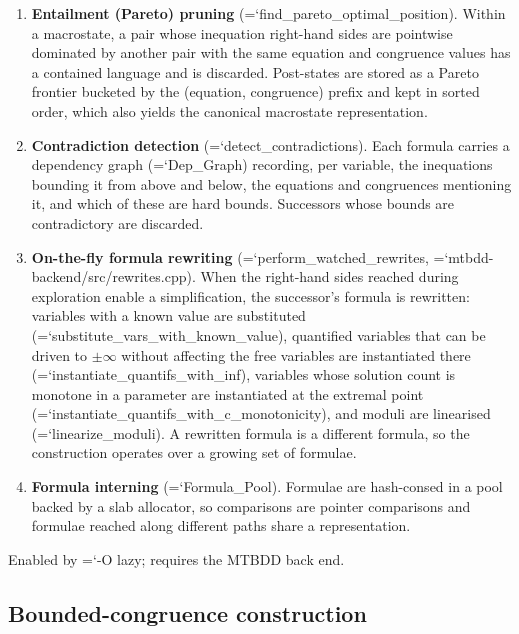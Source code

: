 \documentclass[10pt,a4paper]{article}
\newcommand{\code}[1]{{\small\ttfamily\hyphenchar\font=`\-\relax #1}}
\begin{document}
\begin{enumerate}
  \item \textbf{Entailment (Pareto) pruning} (\code{find\_pareto\_optimal\_position}).  Within a
        macrostate, a pair whose inequation right-hand sides are pointwise dominated by another pair
        with the same equation and congruence values has a contained language and is discarded.
        Post-states are stored as a Pareto frontier bucketed by the (equation, congruence) prefix and
        kept in sorted order, which also yields the canonical macrostate representation.
  \item \textbf{Contradiction detection} (\code{detect\_contradictions}).  Each formula carries a
        dependency graph (\code{Dep\_Graph}) recording, per variable, the inequations bounding it from
        above and below, the equations and congruences mentioning it, and which of these are hard
        bounds.  Successors whose bounds are contradictory are discarded.
  \item \textbf{On-the-fly formula rewriting} (\code{perform\_watched\_rewrites},
        \code{mtbdd-backend/src/rewrites.cpp}).  When the right-hand sides reached during exploration
        enable a simplification, the successor's formula is rewritten: variables with a known value are
        substituted (\code{substitute\_\allowbreak vars\_\allowbreak with\_\allowbreak known\_\allowbreak value}), quantified variables that can be
        driven to $\pm\infty$ without affecting the free variables are instantiated there
        (\code{instantiate\_quantifs\_with\_inf}), variables whose solution count is monotone in a
        parameter are instantiated at the extremal point
        (\code{instantiate\_\allowbreak quantifs\_\allowbreak with\_\allowbreak c\_\allowbreak monotonicity}), and moduli are linearised
        (\code{linearize\_moduli}).  A rewritten formula is a different formula, so the construction
        operates over a growing set of formulae.
  \item \textbf{Formula interning} (\code{Formula\_Pool}).  Formulae are hash-consed in a pool backed by
        a slab allocator, so comparisons are pointer comparisons and formulae reached along different
        paths share a representation.
\end{enumerate}

Enabled by \code{-O lazy}; requires the MTBDD back end.

\subsection{Bounded-congruence construction}
\label{sec:bounded-congruence}
\end{document}
